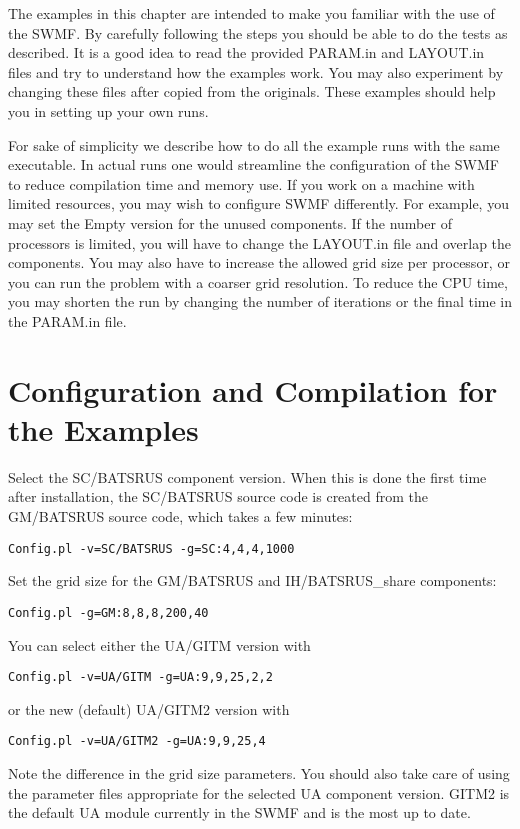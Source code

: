 The examples in this chapter are intended to make you familiar
with the use of the SWMF. By carefully following the steps you should
be able to do the tests as described. It is a good idea to read the
provided PARAM.in and LAYOUT.in files and try to understand how
the examples work. You may also experiment by changing these files
after copied from the originals. These examples should help you
in setting up your own runs.

For sake of simplicity we describe how to do all the example runs with the
same executable. In actual runs one would streamline the configuration
of the SWMF to reduce compilation time and memory use. If you work
on a machine with limited resources, you may wish to configure SWMF
differently. For example, you may set the Empty version for the unused
components. If the number of processors is limited, you will have to
change the LAYOUT.in file and overlap the components. You may also have to 
increase the allowed grid size per processor, or you can run the problem with 
a coarser grid resolution. To reduce the CPU time, you may shorten the 
run by changing the number of iterations or the final time in the 
PARAM.in file.

\section{Configuration and Compilation for the Examples}

Select the SC/BATSRUS component version. When this is done the first time
after installation, the SC/BATSRUS source code is created from the GM/BATSRUS
source code, which takes a few minutes:
\begin{verbatim}
Config.pl -v=SC/BATSRUS -g=SC:4,4,4,1000
\end{verbatim}
Set the grid size for the GM/BATSRUS and IH/BATSRUS\_share components:
\begin{verbatim}
Config.pl -g=GM:8,8,8,200,40
\end{verbatim}
You can select either the UA/GITM version with
\begin{verbatim}
Config.pl -v=UA/GITM -g=UA:9,9,25,2,2
\end{verbatim}
or the new (default) UA/GITM2 version with
\begin{verbatim}
Config.pl -v=UA/GITM2 -g=UA:9,9,25,4
\end{verbatim}
Note the difference in the grid size parameters.
You should also take care of using the parameter files appropriate for
the selected UA component version.  GITM2 is the default UA module
currently in the SWMF and is the most up to date.

